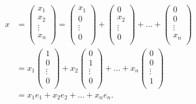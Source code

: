 \begin{example}
    \begin{equation*}
        \begin{split}
            x &= \begin{pmatrix}
                x_1  \\
                x_2  \\
                \vdots  \\
                x_n  \\
            \end{pmatrix}
            = \begin{pmatrix}
                x_1  \\
                0  \\
                \vdots  \\
                0  \\
            \end{pmatrix} + \begin{pmatrix}
                0  \\
                x_2  \\
                \vdots  \\
                0  \\
            \end{pmatrix} + ... + \begin{pmatrix}
                0  \\
                0  \\
                \vdots  \\
                x_n  \\
            \end{pmatrix}\\
            & = x_1 \begin{pmatrix}
                1  \\
                0  \\
                \vdots  \\
                0  \\
            \end{pmatrix} + x_2 \begin{pmatrix}
                0  \\
                1  \\
                \vdots  \\
                0  \\
            \end{pmatrix} + ... + x_n \begin{pmatrix}
                0  \\
                0  \\
                \vdots  \\
                1  \\
            \end{pmatrix}\\
            & = x_1e_1 + x_2e_2 + ... + x_ne_n.
        \end{split}
    \end{equation*}
    

\end{example}
